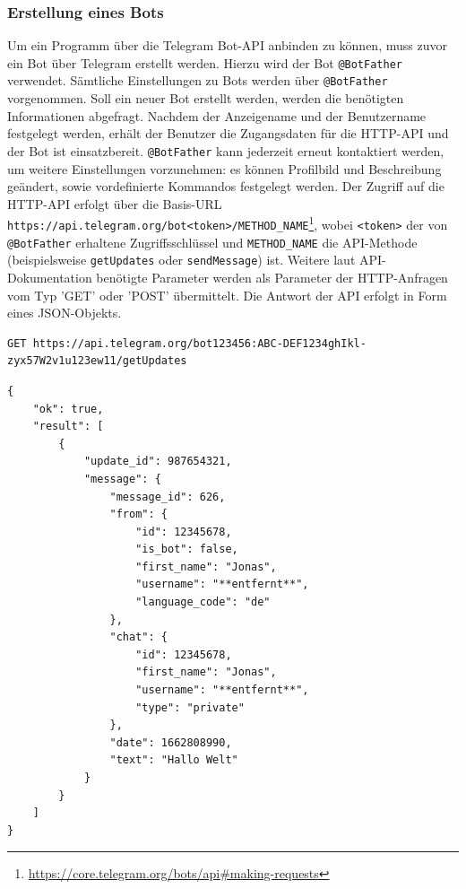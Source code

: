 \subsubsection{Erstellung eines Bots}

Um ein Programm über die Telegram Bot-API anbinden zu können, muss zuvor ein Bot über Telegram erstellt werden. Hierzu wird der Bot \lstinline{@BotFather} verwendet. Sämtliche Einstellungen zu Bots werden über \lstinline{@BotFather} vorgenommen. Soll ein neuer Bot erstellt werden, werden die benötigten Informationen abgefragt. Nachdem der Anzeigename und der Benutzername festgelegt werden, erhält der Benutzer die Zugangsdaten für die HTTP-API und der Bot ist einsatzbereit. \lstinline{@BotFather} kann jederzeit erneut kontaktiert werden, um weitere Einstellungen vorzunehmen: es können Profilbild und Beschreibung geändert, sowie vordefinierte Kommandos festgelegt werden. Der Zugriff auf die HTTP-API erfolgt über die Basis-URL \lstinline{https://api.telegram.org/bot<token>/METHOD_NAME}\footnote{\url{https://core.telegram.org/bots/api\#making-requests}}, wobei \lstinline{<token>} der von \lstinline{@BotFather} erhaltene Zugriffsschlüssel und \lstinline{METHOD_NAME} die API-Methode (beispielsweise \lstinline{getUpdates} oder \lstinline{sendMessage}) ist. Weitere laut API-Dokumentation benötigte Parameter werden als Parameter der HTTP-Anfragen vom Typ 'GET' oder 'POST' übermittelt. Die Antwort der API erfolgt in Form eines JSON-Objekts.

\begin{lstlisting}[caption={Beispiel eines Aufrufs der Telegram HTTP-API. Erhalt einer Textnachricht "Hallo Welt".}, label=lst:bsp-telegram-api, numbers=none, xleftmargin=6mm]
GET https://api.telegram.org/bot123456:ABC-DEF1234ghIkl-zyx57W2v1u123ew11/getUpdates
\end{lstlisting}
\begin{lstlisting}[xleftmargin=6mm]
{
    "ok": true,
    "result": [
        {
            "update_id": 987654321,
            "message": {
                "message_id": 626,
                "from": {
                    "id": 12345678,
                    "is_bot": false,
                    "first_name": "Jonas",
                    "username": "**entfernt**",
                    "language_code": "de"
                },
                "chat": {
                    "id": 12345678,
                    "first_name": "Jonas",
                    "username": "**entfernt**",
                    "type": "private"
                },
                "date": 1662808990,
                "text": "Hallo Welt"
            }
        }
    ]
}
\end{lstlisting}

